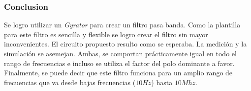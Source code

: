 \documentclass[12pt,a4paper]{article}
\begin{document}
\subsubsection{Conclusion}

Se logro utilizar un \textit{Gyrator} para crear un filtro pasa banda. Como la plantilla para este filtro es sencilla y flexible se logro crear el filtro sin mayor inconvenientes. El circuito propuesto resulto como se esperaba. La medición y la simulación se asemejan. Ambas, se comportan prácticamente igual en todo el rango de frecuencias e incluso se utiliza el factor del polo dominante a favor. Finalmente, se puede decir que este filtro funciona para un amplio rango de frecuencias que va desde bajas frecuencias ($10Hz$) hasta $10Mhz$. 










\end{document}
